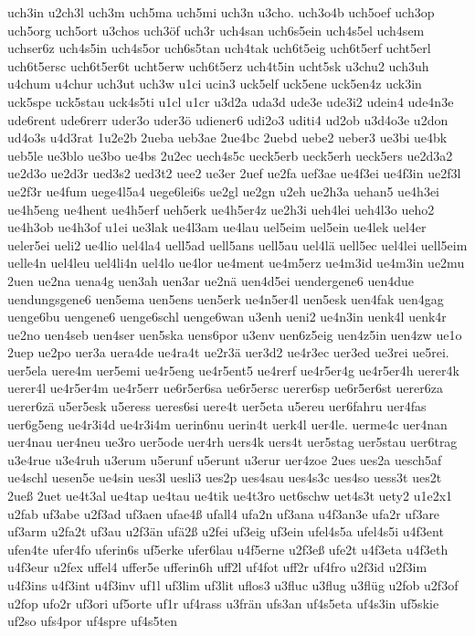 {uch3in
u2ch3l
uch3m
uch5ma
uch5mi
uch3n
u3cho.
uch3o4b
uch5oef
uch3op
uch5org
uch5ort
u3chos
uch3öf
uch3r
uch4san
uch6s5ein
uch4s5el
uch4sem
uchser6z
uch4s5in
uch4s5or
uch6s5tan
uch4tak
uch6t5eig
uch6t5erf
ucht5erl
uch6t5ersc
uch6t5er6t
ucht5erw
uch6t5erz
uch4t5in
ucht5sk
u3chu2
uch3uh
u4chum
u4chur
uch3ut
uch3w
u1ci
ucin3
uck5elf
uck5ene
uck5en4z
uck3in
uck5spe
uck5stau
uck4s5ti
u1cl
u1cr
u3d2a
uda3d
ude3e
ude3i2
udein4
ude4n3e
ude6rent
ude6rerr
uder3o
uder3ö
udiener6
udi2o3
uditi4
ud2ob
u3d4o3e
u2don
ud4o3s
u4d3rat
1u2e2b
2ueba
ueb3ae
2ue4bc
2uebd
uebe2
ueber3
ue3bi
ue4bk
ueb5le
ue3blo
ue3bo
ue4bs
2u2ec
uech4s5c
ueck5erb
ueck5erh
ueck5ers
ue2d3a2
ue2d3o
ue2d3r
ued3s2
ued3t2
uee2
ue3er
2uef
ue2fa
uef3ae
ue4f3ei
ue4f3in
ue2f3l
ue2f3r
ue4fum
uege4l5a4
uege6lei6s
ue2gl
ue2gn
u2eh
ue2h3a
uehan5
ue4h3ei
ue4h5eng
ue4hent
ue4h5erf
ueh5erk
ue4h5er4z
ue2h3i
ueh4lei
ueh4l3o
ueho2
ue4h3ob
ue4h3of
u1ei
ue3lak
ue4l3am
ue4lau
uel5eim
uel5ein
ue4lek
uel4er
ueler5ei
ueli2
ue4lio
uel4la4
uell5ad
uell5ans
uell5au
uel4lä
uell5ec
uel4lei
uell5eim
uelle4n
uel4leu
uel4li4n
uel4lo
ue4lor
ue4ment
ue4m5erz
ue4m3id
ue4m3in
ue2mu
2uen
ue2na
uena4g
uen3ah
uen3ar
ue2nä
uen4d5ei
uendergene6
uen4due
uendungsgene6
uen5ema
uen5ens
uen5erk
ue4n5er4l
uen5esk
uen4fak
uen4gag
uenge6bu
uengene6
uenge6schl
uenge6wan
u3enh
ueni2
ue4n3in
uenk4l
uenk4r
ue2no
uen4seb
uen4ser
uen5ska
uens6por
u3env
uen6z5eig
uen4z5in
uen4zw
ue1o
2uep
ue2po
uer3a
uera4de
ue4ra4t
ue2r3ä
uer3d2
ue4r3ec
uer3ed
ue3rei
ue5rei.
uer5ela
uere4m
uer5emi
ue4r5eng
ue4r5ent5
ue4rerf
ue4r5er4g
ue4r5er4h
uerer4k
uerer4l
ue4r5er4m
ue4r5err
ue6r5er6sa
ue6r5ersc
uerer6sp
ue6r5er6st
uerer6za
uerer6zä
u5er5esk
u5eress
ueres6si
uere4t
uer5eta
u5ereu
uer6fahru
uer4fas
uer6g5eng
ue4r3i4d
ue4r3i4m
uerin6nu
uerin4t
uerk4l
uer4le.
uerme4c
uer4nan
uer4nau
uer4neu
ue3ro
uer5ode
uer4rh
uers4k
uers4t
uer5stag
uer5stau
uer6trag
u3e4rue
u3e4ruh
u3erum
u5erunf
u5erunt
u3erur
uer4zoe
2ues
ues2a
uesch5af
ue4schl
uesen5e
ue4sin
ues3l
uesli3
ues2p
ues4sau
ues4s3c
ues4so
uess3t
ues2t
2ueß
2uet
ue4t3al
ue4tap
ue4tau
ue4tik
ue4t3ro
uet6schw
uet4s3t
uety2
u1e2x1
u2fab
uf3abe
u2f3ad
uf3aen
ufae4ß
ufall4
ufa2n
uf3ana
u4f3an3e
ufa2r
uf3are
uf3arm
u2fa2t
uf3au
u2f3än
ufä2ß
u2fei
uf3eig
uf3ein
ufel4s5a
ufel4s5i
u4f3ent
ufen4te
ufer4fo
uferin6s
uf5erke
ufer6lau
u4f5erne
u2f3eß
ufe2t
u4f3eta
u4f3eth
u4f3eur
u2fex
uffel4
uffer5e
ufferin6h
uff2l
uf4fot
uff2r
uf4fro
u2f3id
u2f3im
u4f3ins
u4f3int
u4f3inv
uf1l
uf3lim
uf3lit
uflos3
u3fluc
u3flug
u3flüg
u2fob
u2f3of
u2fop
ufo2r
uf3ori
uf5orte
uf1r
uf4rass
u3frän
ufs3an
uf4s5eta
uf4s3in
uf5skie
uf2so
ufs4por
uf4spre
uf4s5ten
}
